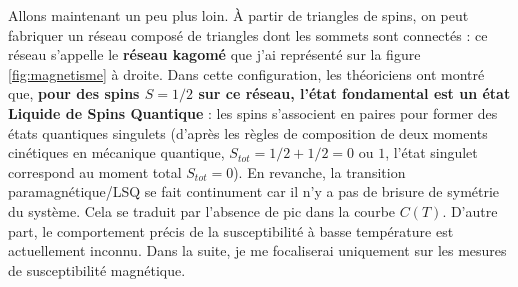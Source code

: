 Allons maintenant un peu plus loin. \`{A} partir de triangles de spins, on peut fabriquer un réseau composé de triangles dont les sommets sont connectés : ce réseau s'appelle le \textbf{réseau kagomé} que j'ai représenté sur la figure \ref{fig:magnetisme} à droite. Dans cette configuration, les théoriciens ont montré que, \textbf{pour des spins $S=1/2$ sur ce réseau, l'état fondamental est un état Liquide de Spins Quantique} : les spins s'associent en paires pour former des états quantiques singulets (d'après les règles de composition de deux moments cinétiques en mécanique quantique, $S_{tot}=1/2+1/2=0$ ou $1$, l'état singulet correspond au moment total $S_{tot}=0$). En revanche, la transition paramagnétique/LSQ se fait continument car il n'y a pas de brisure de symétrie du système. Cela se traduit par l'absence de pic dans la courbe $C(T)$. D'autre part, le comportement précis de la susceptibilité à basse température est actuellement inconnu. Dans la suite, je me focaliserai uniquement sur les mesures de susceptibilité magnétique.
